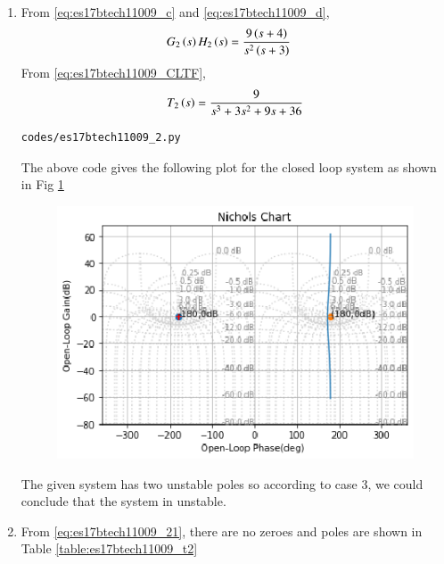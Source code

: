 \begin{enumerate}[label=\thesection.\arabic*.,ref=\thesection.\theenumi]
\item
From \eqref{eq:es17btech11009_c} and \eqref{eq:es17btech11009_d},
\begin{align}
G_{2}\brak{s}H_{2}\brak{s}&= \frac{9\brak{s+4}}{s^2\brak{s+3}}
\label{eq:es17btech11009_bb}
\end{align}
\solution
 From \eqref{eq:es17btech11009_CLTF},
 \begin{align}
T_{2}\brak{s} = \frac{9}{s^3 + 3s^2 + 9s + 36}
\label{eq:es17btech11009_21}
 \end{align}
\begin{lstlisting}
codes/es17btech11009_2.py
\end{lstlisting}
The above code gives the following plot for the closed loop system as shown in Fig \ref{fig:es17btech11009_fig2}
\begin{figure}[!h]
\centering
\includegraphics[width=\columnwidth]{./figs/es17btech11009_2.eps}
\caption{}
\label{fig:es17btech11009_fig2}
\end{figure}
The given system has two unstable poles so according to case 3, we could conclude that the system in unstable.
\item
From \eqref{eq:es17btech11009_21},
there are no zeroes and poles are shown in Table \ref{table:es17btech11009_t2}


\end{enumerate}
